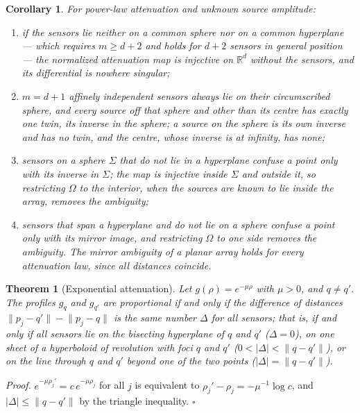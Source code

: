 \documentclass{article}
\newtheorem{theorem}{\bf Theorem}
\newtheorem{corollary}{\bf Corollary}
\begin{document}
\begin{corollary} \label{cor:sensors}
For power-law attenuation and unknown source amplitude:

\begin{enumerate}
\renewcommand{\labelenumi}{(\roman{enumi})}
\item
  if the sensors lie neither on a common sphere nor on a common hyperplane --- which requires $m \ge d + 2$ and holds for $d + 2$ sensors in general position --- the normalized attenuation map is injective on $\mathbb{R}^{d}$ without the sensors, and its differential is nowhere singular;
\item
  $m = d + 1$ affinely independent sensors always lie on their circumscribed sphere, and every source off that sphere and other than its centre has exactly one twin, its inverse in the sphere; a source on the sphere is its own inverse and has no twin, and the centre, whose inverse is at infinity, has none;
\item
  sensors on a sphere $\Sigma$ that do not lie in a hyperplane confuse a point only with its inverse in $\Sigma$; the map is injective inside $\Sigma$ and outside it, so restricting $\Omega$ to the interior, when the sources are known to lie inside the array, removes the ambiguity;
\item
  sensors that span a hyperplane and do not lie on a sphere confuse a point only with its mirror image, and restricting $\Omega$ to one side removes the ambiguity. The mirror ambiguity of a planar array holds for every attenuation law, since all distances coincide.
\end{enumerate}
\end{corollary}

\begin{theorem}[Exponential attenuation] \label{thm:exponential}
Let $g(\rho) = e^{-\mu\rho}$ with $\mu > 0$, and $q \neq q'$. The profiles $g_q$ and $g_{q'}$ are proportional if and only if the difference of distances $\lVert p_j - q' \rVert - \lVert p_j - q \rVert$ is the same number $\Delta$ for all sensors; that is, if and only if all sensors lie on the bisecting hyperplane of $q$ and $q'$ ($\Delta = 0$), on one sheet of a hyperboloid of revolution with foci $q$ and $q'$ ($0 < |\Delta| < \lVert q - q' \rVert$), or on the line through $q$ and $q'$ beyond one of the two points ($|\Delta| = \lVert q - q' \rVert$).
\end{theorem}

\textit{Proof.} $e^{-\mu \rho_j'} = c\, e^{-\mu \rho_j}$ for all $j$ is equivalent to $\rho_j' - \rho_j = -\mu^{-1} \log c$, and $|\Delta| \le \lVert q - q' \rVert$ by the triangle inequality. $\square$
\end{document}

